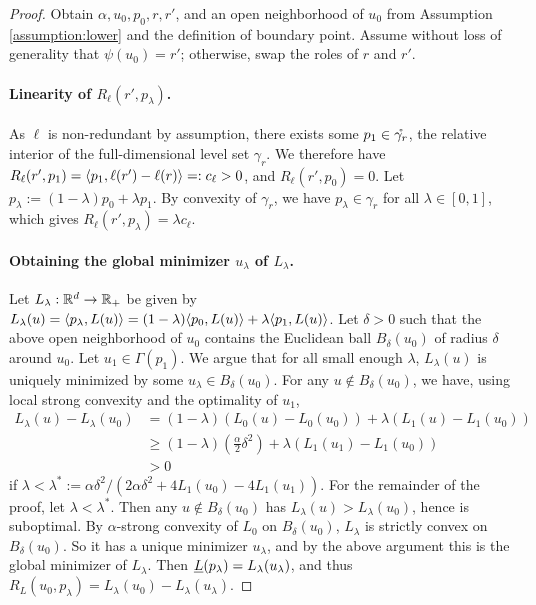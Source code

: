 \begin{proof}
  Obtain $\alpha, u_0, p_0, r, r'$, and an open neighborhood of $u_0$ from Assumption \ref{assumption:lower} and the definition of boundary point.
  Assume without loss of generality that $\psi(u_0) = r'$; otherwise, swap the roles of $r$ and $r'$.

  \paragraph{Linearity of $R_{\ell}(r',p_{\lambda})$.}
  As $\ell$ is non-redundant by assumption, there exists some $p_1 \in \mathring{\gamma_r}$, the relative interior of the full-dimensional level set $\gamma_r$.
  We therefore have $R_\ell(r',p_1) = \langle p_1, \ell(r')-\ell(r) \rangle =: c_\ell > 0$, and $R_\ell(r',p_0) = 0$.
  Let $p_\lambda := (1-\lambda) p_0 + \lambda p_1$.
  By convexity of $\gamma_r$, we have $p_\lambda \in \gamma_r$ for all $\lambda \in [0,1]$, which gives $R_\ell(r',p_\lambda) = \lambda c_\ell$.

  \paragraph{Obtaining the global minimizer $u_{\lambda}$ of $L_{\lambda}$.}
  Let $L_\lambda:\mathbb{R}^d\to\mathbb{R}_+$ be given by $L_\lambda(u) = \langle p_\lambda, L(u) \rangle = (1-\lambda) \langle p_0, L(u) \rangle + \lambda \langle p_1, L(u) \rangle$.
  Let $\delta >0$ such that the above open neighborhood of $u_0$ contains the Euclidean ball $B_\delta(u_0)$ of radius $\delta$ around $u_0$.
  Let $u_1 \in \Gamma(p_1)$.
  We argue that for all small enough $\lambda$, $L_{\lambda}(u)$ is uniquely minimized by some $u_{\lambda} \in B_{\delta}(u_0)$.
  For any $u\notin B_\delta(u_0)$, we have, using local strong convexity and the optimality of $u_1$,
  \begin{align*}
    L_\lambda(u) - L_\lambda(u_0)
    &=
      (1-\lambda) \left( L_0(u) - L_0(u_0) \right)
      + \lambda \left( L_1(u) - L_1(u_0) \right)
    \\
    &\geq
      (1-\lambda) \left( \frac \alpha 2 \delta^2 \right)
      + \lambda \left( L_1(u_1) - L_1(u_0) \right)~  \\
    &> 0
  \end{align*}
  if $\lambda < \lambda^* := \alpha \delta^2 / (2 \alpha \delta^2 + 4 L_1(u_0) - 4 L_1(u_1))$.
  For the remainder of the proof, let $\lambda < \lambda^*$.
  Then any $u\notin B_{\delta}(u_0)$ has $L_{\lambda}(u) > L_{\lambda}(u_0)$, hence is suboptimal.
  By $\alpha$-strong convexity of $L_0$ on $B_\delta(u_0)$, $L_\lambda$ is strictly convex on $B_\delta(u_0)$.
  So it has a unique minimizer $u_{\lambda}$, and by the above argument this is the global minimizer of $L_{\lambda}$.
  Then $\underline{L}(p_\lambda) = L_\lambda(u_\lambda)$, and thus $R_L(u_0,p_\lambda) = L_\lambda(u_0) - L_\lambda(u_\lambda)$.


\end{proof}
